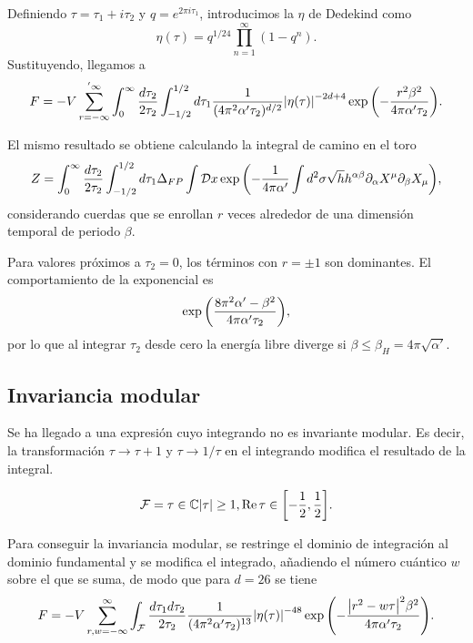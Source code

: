 Definiendo $\tau=\tau_1+i\tau_2$ y $q=e^{2\pi i\tau_1}$, introducimos la $\eta$ de 
Dedekind como
\begin{equation}
  \eta(\tau)=q^{1/24}\prod_{n=1}^{\infty} (1-q^n).
\end{equation}
Sustituyendo, llegamos a 
\begin{equation}
  F=-V \sum_{r=-\infty}^{'\infty} \int_0^\infty\frac{d\tau_2}{2\tau_2} \int_{-1/2}^{1/2} d\tau_1  \frac{1}{(4\pi^2\alpha'\tau_2)^{d/2}}
  \abs{\eta(\tau)}^{-2d+4}\exp\qty(-\frac{r^2\beta^2}{4\pi\alpha'\tau_2}).
  \label{eq:strip}
\end{equation}

El mismo resultado se obtiene calculando la integral de camino en el toro
\begin{equation}
  Z= \int_0^\infty\frac{d\tau_2}{2\tau_2} \int_{-1/2}^{1/2} d\tau_1 \Delta_{FP} \int \mathcal Dx
  \exp\qty(-\frac{1}{4\pi\alpha'}\int d^2\sigma \sqrt h h^{\alpha\beta}\partial_\alpha X^\mu \partial_\beta X_\mu),
\end{equation}
considerando cuerdas que se enrollan $r$ veces alrededor de una dimensión temporal de periodo $\beta$.

Para valores próximos a $\tau_2=0$, los términos con $r=\pm 1$ son dominantes.
El comportamiento de la exponencial es
\begin{equation}
  \exp\qty(\frac{8\pi^2 \alpha' -\beta^2}{4\pi\alpha'\tau_2}),
\end{equation}
por lo que al integrar $\tau_2$ desde cero la energía libre diverge si $\beta\leq \beta_H=4\pi\sqrt{\alpha'}$.

\subsection{Invariancia modular}

Se ha llegado a una expresión cuyo integrando no es invariante modular. Es decir, la 
transformación $\tau\to\tau+1$ y $\tau\to1/\tau$ en el integrando modifica el resultado
de la integral.

\begin{equation}
  \mathcal F = { \tau \in \mathbb{C} \abs{\tau} \geq 1, \Re\tau \in \qty[-\frac 1 2, \frac 1 2]}.
\end{equation}

Para conseguir la invariancia modular, se restringe el dominio de integración al dominio
fundamental y se modifica el integrado, añadiendo el número cuántico $w$ sobre el que 
se suma, de modo que para $d=26$ se tiene
\begin{equation}
  F=-V \sum_{r,w=-\infty}^{\infty} \int_\mathcal{F}  \frac{d\tau_1d\tau_2}{2\tau_2}   \frac{1}{(4\pi^2\alpha'\tau_2)^{13}}
  \abs{\eta(\tau)}^{-48}\exp\qty(-\frac{\abs{r^2-w\tau}^2\beta^2}{4\pi\alpha'\tau_2}).
  \label{eq:fund}
\end{equation}


